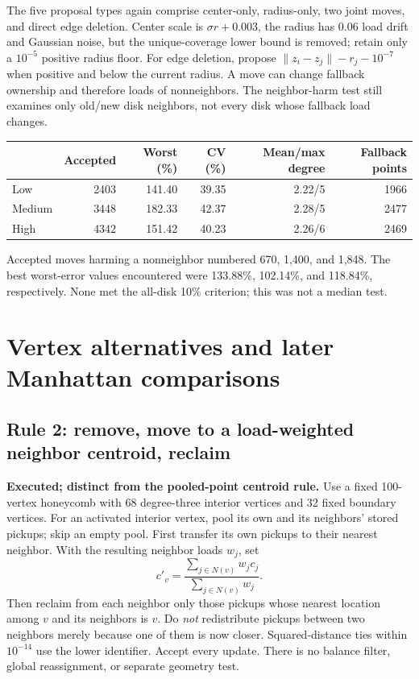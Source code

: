 \documentclass[11pt]{article}
\begin{document}
The five proposal types again comprise center-only, radius-only, two joint
moves, and direct edge deletion. Center scale is $\sigma r+0.003$, the radius
has 0.06 load drift and Gaussian noise, but the unique-coverage lower bound is
removed; retain only a $10^{-5}$ positive radius floor. For edge deletion,
propose $\|z_i-z_j\|-r_j-10^{-7}$ when positive and below the current radius.
A move can change fallback ownership and therefore loads of nonneighbors.
The neighbor-harm test still examines only old/new disk neighbors, not every
disk whose fallback load changes.

\begin{center}\begin{tabular}{lrrrrr}
\toprule & Accepted & Worst (\%) & CV (\%) & Mean/max degree & Fallback points\\\midrule
Low&2403&141.40&39.35&2.22/5&1966\\
Medium&3448&182.33&42.37&2.28/5&2477\\
High&4342&151.42&40.23&2.26/6&2469\\\bottomrule
\end{tabular}\end{center}
Accepted moves harming a nonneighbor numbered 670, 1,400, and 1,848.
The best worst-error values encountered were 133.88\%, 102.14\%, and 118.84\%,
respectively. None met the all-disk 10\% criterion; this was not a median test.

\section{Vertex alternatives and later Manhattan comparisons}
\subsection{Rule 2: remove, move to a load-weighted neighbor centroid, reclaim}
\textbf{Executed; distinct from the pooled-point centroid rule.}
Use a fixed 100-vertex honeycomb with 68 degree-three interior vertices and
32 fixed boundary vertices. For an activated interior vertex, pool its own and
its neighbors' stored pickups; skip an empty pool. First transfer its own
pickups to their nearest neighbor. With the resulting neighbor loads $w_j$, set
\[
 c'_v=\frac{\sum_{j\in N(v)} w_jc_j}{\sum_{j\in N(v)} w_j}.
\]
Then reclaim from each neighbor only those pickups whose nearest location among
$v$ and its neighbors is $v$. Do \emph{not} redistribute pickups between two
neighbors merely because one of them is now closer. Squared-distance ties
within $10^{-14}$ use the lower identifier. Accept every update. There is no
balance filter, global reassignment, or separate geometry test.
\end{document}
